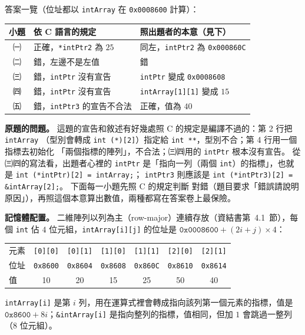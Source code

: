 \begin{pastsoln}
答案一覽（位址都以 \texttt{intArray} 在 \texttt{0x0008600} 計算）：
\begin{center}
\begin{tabular}{cll}
\toprule
小題 & 依 C 語言的規定 & 照出題者的本意（見下）\\
\midrule
㈠ & 正確，\texttt{*intPtr2} 為 $25$ & 同左，\texttt{intPtr2} 為 \texttt{0x000860C} \\
㈡ & 錯，左邊不是左值 & 錯 \\
㈢ & 錯，\texttt{intPtr} 沒有宣告 & \texttt{intPtr} 變成 \texttt{0x0008608} \\
㈣ & 錯，\texttt{intPtr} 沒有宣告 & \texttt{intArray[1][1]} 變成 $15$ \\
㈤ & 錯，\texttt{intPtr3} 的宣告不合法 & 正確，值為 $40$ \\
\bottomrule
\end{tabular}
\end{center}

\textbf{原題的問題。} 這題的宣告和敘述有好幾處照 C 的規定是編譯不過的：第 2 行把 \texttt{intArray}
（型別會轉成 \texttt{int (*)[2]}）指定給 \texttt{int **}，型別不合；第 4 行用一個指標去初始化
「兩個指標的陣列」，不合法；㈢㈣用的 \texttt{intPtr} 根本沒有宣告。 從㈢㈣的寫法看，出題者心裡的
\texttt{intPtr} 是「指向一列（兩個 \texttt{int}）的指標」，也就是 \texttt{int (*intPtr)[2] = intArray;}；
\texttt{intPtr3} 則應該是 \texttt{int (*intPtr3)[2] = \&intArray[2];}。 下面每一小題先照 C 的規定判斷
對錯（題目要求「錯誤請說明原因」），再照這個本意算出數值，兩種都寫在答案卷上最保險。

\textbf{記憶體配置。} 二維陣列以列為主（row-major）連續存放（資結書第~4.1~節），每個 \texttt{int}
佔 $4$ 位元組，\texttt{intArray[i][j]} 的位址是 $\texttt{0x0008600} + (2i + j) \times 4$：
\begin{center}
\begin{tabular}{lcccccc}
\toprule
元素 & \texttt{[0][0]} & \texttt{[0][1]} & \texttt{[1][0]} & \texttt{[1][1]} & \texttt{[2][0]} & \texttt{[2][1]} \\
位址 & \texttt{0x8600} & \texttt{0x8604} & \texttt{0x8608} & \texttt{0x860C} & \texttt{0x8610} & \texttt{0x8614} \\
值 & 10 & 20 & 15 & 25 & 50 & 40 \\
\bottomrule
\end{tabular}
\end{center}
\texttt{intArray[i]} 是第 $i$ 列，用在運算式裡會轉成指向該列第一個元素的指標，值是
$\texttt{0x8600} + 8i$；\texttt{\&intArray[i]} 是指向整列的指標，值相同，但加 $1$ 會跳過一整列
（$8$ 位元組）。


\end{pastsoln}
